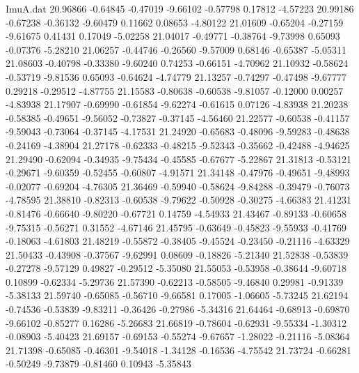 \begin{filecontents}{ImuA.dat}
  20.96866   -0.64845   -0.47019   -9.66102   -0.57798    0.17812   -4.57223
  20.99186   -0.67238   -0.36132   -9.60479    0.11662    0.08653   -4.80122
  21.01609   -0.65204   -0.27159   -9.61675    0.41431    0.17049   -5.02258
  21.04017   -0.49771   -0.38764   -9.73998    0.65093   -0.07376   -5.28210
  21.06257   -0.44746   -0.26560   -9.57009    0.68146   -0.65387   -5.05311
  21.08603   -0.40798   -0.33380   -9.60240    0.74253   -0.66151   -4.70962
  21.10932   -0.58624   -0.53719   -9.81536    0.65093   -0.64624   -4.74779
  21.13257   -0.74297   -0.47498   -9.67777    0.29218   -0.29512   -4.87755
  21.15583   -0.80638   -0.60538   -9.81057   -0.12000    0.00257   -4.83938
  21.17907   -0.69990   -0.61854   -9.62274   -0.61615    0.07126   -4.83938
  21.20238   -0.58385   -0.49651   -9.56052   -0.73827   -0.37145   -4.56460
  21.22577   -0.60538   -0.41157   -9.59043   -0.73064   -0.37145   -4.17531
  21.24920   -0.65683   -0.48096   -9.59283   -0.48638   -0.24169   -4.38904
  21.27178   -0.62333   -0.48215   -9.52343   -0.35662   -0.42488   -4.94625
  21.29490   -0.62094   -0.34935   -9.75434   -0.45585   -0.67677   -5.22867
  21.31813   -0.53121   -0.29671   -9.60359   -0.52455   -0.60807   -4.91571
  21.34148   -0.47976   -0.49651   -9.48993   -0.02077   -0.69204   -4.76305
  21.36469   -0.59940   -0.58624   -9.84288   -0.39479   -0.76073   -4.78595
  21.38810   -0.82313   -0.60538   -9.79622   -0.50928   -0.30275   -4.66383
  21.41231   -0.81476   -0.66640   -9.80220   -0.67721    0.14759   -4.54933
  21.43467   -0.89133   -0.60658   -9.75315   -0.56271    0.31552   -4.67146
  21.45795   -0.63649   -0.45823   -9.55933   -0.41769   -0.18063   -4.61803
  21.48219   -0.55872   -0.38405   -9.45524   -0.23450   -0.21116   -4.63329
  21.50433   -0.43908   -0.37567   -9.62991    0.08609   -0.18826   -5.21340
  21.52838   -0.53839   -0.27278   -9.57129    0.49827   -0.29512   -5.35080
  21.55053   -0.53958   -0.38644   -9.60718    0.10899   -0.62334   -5.29736
  21.57390   -0.62213   -0.58505   -9.46840    0.29981   -0.91339   -5.38133
  21.59740   -0.65085   -0.56710   -9.66581    0.17005   -1.06605   -5.73245
  21.62194   -0.74536   -0.53839   -9.83211   -0.36426   -0.27986   -5.34316
  21.64464   -0.68913   -0.69870   -9.66102   -0.85277    0.16286   -5.26683
  21.66819   -0.78604   -0.62931   -9.55334   -1.30312   -0.08903   -5.40423
  21.69157   -0.69153   -0.55274   -9.67657   -1.28022   -0.21116   -5.08364
  21.71398   -0.65085   -0.46301   -9.54018   -1.34128   -0.16536   -4.75542
  21.73724   -0.66281   -0.50249   -9.73879   -0.81460    0.10943   -5.35843

\end{filecontents}
